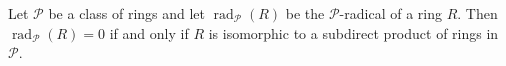 Let $\mathcal{P}$ be a class of rings and let $\operatorname{rad}_{\mathcal{P}}(R)$ be the $\mathcal{P}$-radical of a ring $R$. Then $\operatorname{rad}_{\mathcal{P}}(R) = 0$ if and only if $R$ is isomorphic to a subdirect product of rings in $\mathcal{P}$.
